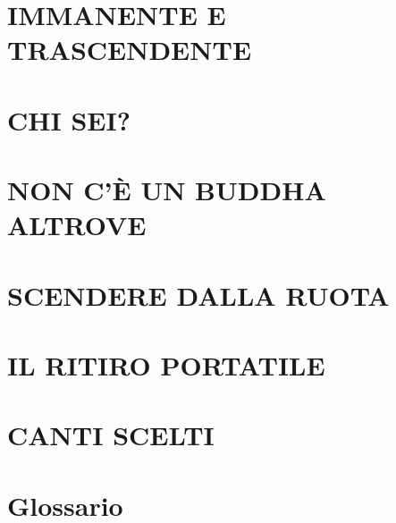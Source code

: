 \documentclass[11pt]{memoir}
\begin{document}
\chapter{IMMANENTE E TRASCENDENTE}


\chapter*{CHI SEI?}
\thispagestyle{empty}

\chapter{NON C'\`E UN BUDDHA ALTROVE}


\chapter{SCENDERE DALLA RUOTA}


\chapter{IL RITIRO PORTATILE}



\chapter*{CANTI SCELTI}


\chapter*{Glossario}

\end{document}
